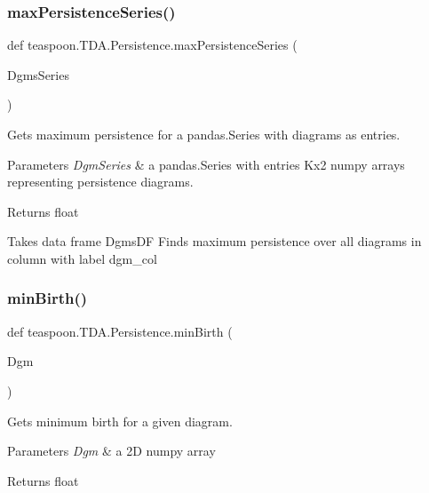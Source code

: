 \subsubsection{\texorpdfstring{max\+Persistence\+Series()}{maxPersistenceSeries()}}
{\footnotesize\ttfamily def teaspoon.\+T\+D\+A.\+Persistence.\+max\+Persistence\+Series (\begin{DoxyParamCaption}\item[{}]{Dgms\+Series }\end{DoxyParamCaption})}



Gets maximum persistence for a pandas.\+Series with diagrams as entries. 


\begin{DoxyParams}{Parameters}
{\em Dgm\+Series} & a pandas.\+Series with entries Kx2 numpy arrays representing persistence diagrams.\\
\hline
\end{DoxyParams}
\begin{DoxyReturn}{Returns}
float \begin{DoxyVerb}Takes data frame DgmsDF
Finds maximum persistence over all diagrams in
column with label dgm_col
\end{DoxyVerb}
 
\end{DoxyReturn}
\mbox{\label{namespaceteaspoon_1_1_t_d_a_1_1_persistence_a4cb4a0b96d87e48f0d1170fd0252a9ae}} 
\subsubsection{\texorpdfstring{min\+Birth()}{minBirth()}}
{\footnotesize\ttfamily def teaspoon.\+T\+D\+A.\+Persistence.\+min\+Birth (\begin{DoxyParamCaption}\item[{}]{Dgm }\end{DoxyParamCaption})}



Gets minimum birth for a given diagram. 


\begin{DoxyParams}{Parameters}
{\em Dgm} & a 2D numpy array\\
\hline
\end{DoxyParams}
\begin{DoxyReturn}{Returns}
float 
\end{DoxyReturn}
\mbox{\label{namespaceteaspoon_1_1_t_d_a_1_1_persistence_a1db04f6a997b34a930bc3e28d2cb709e}} 
